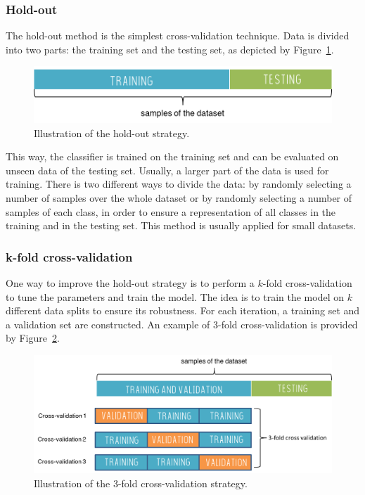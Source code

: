 \documentclass[a4paper,10pt]{article}
\begin{document}
\subsubsection{Hold-out}

The hold-out method is the simplest cross-validation technique. Data is divided into two parts: the training set and the testing set, as depicted by Figure~\ref{holdout}.
\begin{figure}[htbp]
\centerline{\includegraphics[width=0.8\linewidth]{./figures/holdout.png}}
\caption{Illustration of the hold-out strategy.}
\label{holdout}
\end{figure}
This way, the classifier is trained on the training set and can be evaluated on unseen data of the testing set. Usually, a larger part of the data is used for training. There is two different ways to divide the data: by randomly selecting a number of samples over the whole dataset or by randomly selecting a number of samples of each class, in order to ensure a representation of all classes in the training and in the testing set.
This method is usually applied for small datasets.

\subsubsection{k-fold cross-validation}

One way to improve the hold-out strategy is to perform a $k$-fold cross-validation to tune the parameters and train the model. The idea is to train the model on $k$ different data splits to ensure its robustness.
For each iteration, a training set and a validation set are constructed.
An example of 3-fold cross-validation is provided by Figure~\ref{kfold}.

\begin{figure}[htbp]
\centerline{\includegraphics[width=0.8\linewidth]{./figures/kfold.png}}
\caption{Illustration of the 3-fold cross-validation strategy.}
\label{kfold}
\end{figure}
\end{document}
